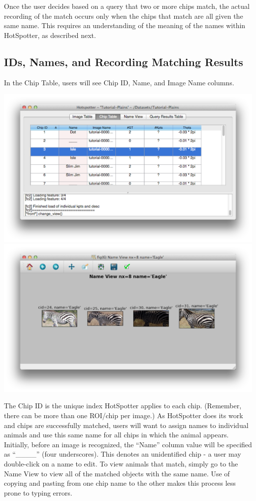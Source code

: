\documentclass[a4paper,10pt]{article}
\begin{document}
\noindent
  Once the user decides based on a query that two or more chips match,
  the actual recording of the match occurs only when the chips that
  match are all given the same name.  This requires an understanding
  of the meaning of the names within HotSpotter, as described next.

\subsection{IDs, Names, and Recording Matching Results}

   In the Chip Table, users will see Chip ID, Name, and Image Name columns.

\begin{center}
            \includegraphics[scale=0.1]{images/names.png}
            \includegraphics[scale=0.1]{images/matches.png}
\end{center}

\noindent
  The Chip ID is the unique index HotSpotter applies to
  each chip.  (Remember, there can be more than one ROI/chip per image.)
  As HotSpotter does its work and chips are successfully matched,
  users will want to assign names to individual animals and use this
  same name for all chips in which the animal appears.  Initially,
  before an image is recognized, the ``Name'' column value will
  be specified as ``\_\_\_\_'' (four underscores).  This denotes an
  unidentified chip - a user may double-click on a name to edit. 
  To view animals that match, simply go to the Name View to view all of the matched objects with the same name. 
  Use of copying and pasting from one chip name to the other makes this process less prone to
  typing errors.
\end{document}
